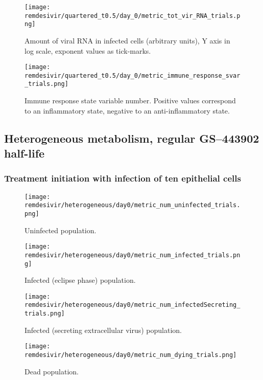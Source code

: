 \begin{figure}[H]
\texttt{[image: remdesivir/quartered\_t0.5/day\_0/metric\_tot\_vir\_RNA\_trials.png]}
\caption{Amount of viral RNA in infected cells (arbitrary units), Y axis in log scale, exponent values as tick-marks.\label{fig:app:homo_quartered:day0:vir_RNA}}
\end{figure}

\begin{figure}[H]
\texttt{[image: remdesivir/quartered\_t0.5/day\_0/metric\_immune\_response\_svar\_trials.png]}
\caption{Immune response state variable number. Positive values correspond to an inflammatory state, negative to an anti-inflammatory state.\label{fig:app:homo_quartered:day0:immune_var}}
\end{figure}
\clearpage
\subsection{Heterogeneous metabolism, regular GS--443902 half-life}\label{sup:sec:extra_figures:hetero_regular}

\subsubsection{Treatment initiation with infection of ten epithelial cells}\label{sup:sec:extra_figures:hetero_regular:day0}

\begin{figure}[H]
\texttt{[image: remdesivir/heterogeneous/day0/metric\_num\_uninfected\_trials.png]}
\caption{Uninfected population.\label{fig:app:hetero_regular:day0:uninf}}
\end{figure}

\begin{figure}[H]
\texttt{[image: remdesivir/heterogeneous/day0/metric\_num\_infected\_trials.png]}
\caption{Infected (eclipse phase) population.\label{fig:app:hetero_regular:day0:inf}}
\end{figure}

\begin{figure}[H]
\texttt{[image: remdesivir/heterogeneous/day0/metric\_num\_infectedSecreting\_trials.png]}
\caption{Infected (secreting extracellular virus) population.\label{fig:app:hetero_regular:day0:infSecr}}
\end{figure}

\begin{figure}[H]
\texttt{[image: remdesivir/heterogeneous/day0/metric\_num\_dying\_trials.png]}
\caption{Dead population.\label{fig:app:hetero_regular:day0:dead}}
\end{figure}

